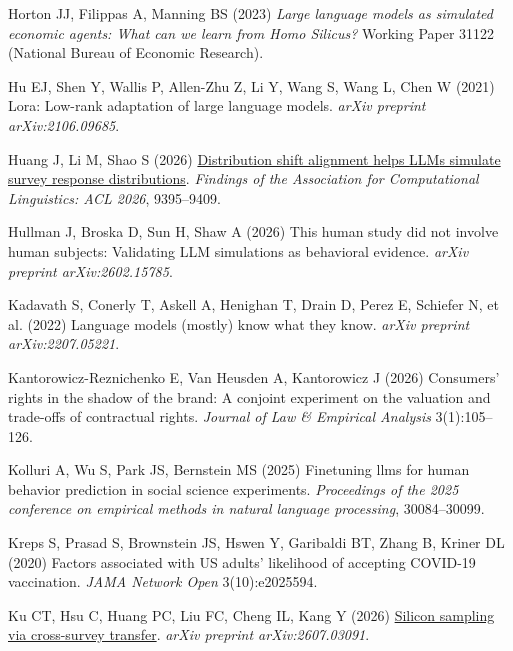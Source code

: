 \documentclass[
  11pt,
  letterpaper,
]{article}
\newlength{\cslhangindent}
\newenvironment{CSLReferences}[2] %
 {\begin{list}{}{%
  \setlength{\itemindent}{0pt}
  \setlength{\leftmargin}{0pt}
  \setlength{\parsep}{0pt}
  \ifodd #1
   \setlength{\leftmargin}{\cslhangindent}
   \setlength{\itemindent}{-1\cslhangindent}
  \fi
  \setlength{\itemsep}{#2\baselineskip}}}
 {\end{list}}
\begin{document}
\begin{CSLReferences}{1}{0}
Horton JJ, Filippas A, Manning BS (2023) \emph{Large language models as
simulated economic agents: What can we learn from {Homo Silicus}?}
Working Paper 31122 (National Bureau of Economic Research).

Hu EJ, Shen Y, Wallis P, Allen-Zhu Z, Li Y, Wang S, Wang L, Chen W
(2021) Lora: Low-rank adaptation of large language models. \emph{arXiv
preprint arXiv:2106.09685}.

Huang J, Li M, Shao S (2026)
\href{https://doi.org/10.18653/v1/2026.findings-acl.457}{Distribution
shift alignment helps {LLM}s simulate survey response distributions}.
\emph{Findings of the {A}ssociation for {C}omputational {L}inguistics:
{ACL} 2026}, 9395--9409.

Hullman J, Broska D, Sun H, Shaw A (2026) This human study did not
involve human subjects: Validating LLM simulations as behavioral
evidence. \emph{arXiv preprint arXiv:2602.15785}.

{Kadavath S, Conerly T, Askell A, Henighan T, Drain D, Perez E, Schiefer
N, et al.} (2022) Language models (mostly) know what they know.
\emph{arXiv preprint arXiv:2207.05221}.

Kantorowicz-Reznichenko E, Van Heusden A, Kantorowicz J (2026)
Consumers' rights in the shadow of the brand: A conjoint experiment on
the valuation and trade-offs of contractual rights. \emph{Journal of Law
\& Empirical Analysis} 3(1):105--126.

Kolluri A, Wu S, Park JS, Bernstein MS (2025) Finetuning llms for human
behavior prediction in social science experiments. \emph{Proceedings of
the 2025 conference on empirical methods in natural language
processing}, 30084--30099.

Kreps S, Prasad S, Brownstein JS, Hswen Y, Garibaldi BT, Zhang B, Kriner
DL (2020) Factors associated with {US} adults' likelihood of accepting
COVID-19 vaccination. \emph{JAMA Network Open} 3(10):e2025594.

Ku CT, Hsu C, Huang PC, Liu FC, Cheng IL, Kang Y (2026)
\href{https://arxiv.org/abs/2607.03091}{Silicon sampling via
cross-survey transfer}. \emph{arXiv preprint arXiv:2607.03091}.


\end{CSLReferences}
\end{document}
